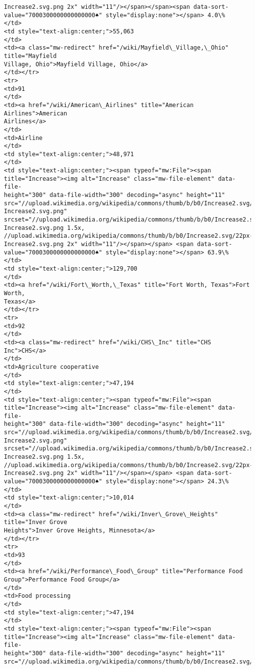 \documentclass[11pt]{article}
\begin{document}
\begin{Verbatim}[commandchars=\\\{\}]
Increase2.svg.png 2x" width="11"/></span></span><span data-sort-
value="7000300000000000000♠" style="display:none"></span> 4.0\%
</td>
<td style="text-align:center;">55,063
</td>
<td><a class="mw-redirect" href="/wiki/Mayfield\_Village,\_Ohio" title="Mayfield
Village, Ohio">Mayfield Village, Ohio</a>
</td></tr>
<tr>
<td>91
</td>
<td><a href="/wiki/American\_Airlines" title="American Airlines">American
Airlines</a>
</td>
<td>Airline
</td>
<td style="text-align:center;">48,971
</td>
<td style="text-align:center;"><span typeof="mw:File"><span
title="Increase"><img alt="Increase" class="mw-file-element" data-file-
height="300" data-file-width="300" decoding="async" height="11"
src="//upload.wikimedia.org/wikipedia/commons/thumb/b/b0/Increase2.svg/11px-
Increase2.svg.png"
srcset="//upload.wikimedia.org/wikipedia/commons/thumb/b/b0/Increase2.svg/17px-
Increase2.svg.png 1.5x,
//upload.wikimedia.org/wikipedia/commons/thumb/b/b0/Increase2.svg/22px-
Increase2.svg.png 2x" width="11"/></span></span> <span data-sort-
value="7000300000000000000♠" style="display:none"></span> 63.9\%
</td>
<td style="text-align:center;">129,700
</td>
<td><a href="/wiki/Fort\_Worth,\_Texas" title="Fort Worth, Texas">Fort Worth,
Texas</a>
</td></tr>
<tr>
<td>92
</td>
<td><a class="mw-redirect" href="/wiki/CHS\_Inc" title="CHS Inc">CHS</a>
</td>
<td>Agriculture cooperative
</td>
<td style="text-align:center;">47,194
</td>
<td style="text-align:center;"><span typeof="mw:File"><span
title="Increase"><img alt="Increase" class="mw-file-element" data-file-
height="300" data-file-width="300" decoding="async" height="11"
src="//upload.wikimedia.org/wikipedia/commons/thumb/b/b0/Increase2.svg/11px-
Increase2.svg.png"
srcset="//upload.wikimedia.org/wikipedia/commons/thumb/b/b0/Increase2.svg/17px-
Increase2.svg.png 1.5x,
//upload.wikimedia.org/wikipedia/commons/thumb/b/b0/Increase2.svg/22px-
Increase2.svg.png 2x" width="11"/></span></span> <span data-sort-
value="7000300000000000000♠" style="display:none"></span> 24.3\%
</td>
<td style="text-align:center;">10,014
</td>
<td><a class="mw-redirect" href="/wiki/Inver\_Grove\_Heights" title="Inver Grove
Heights">Inver Grove Heights, Minnesota</a>
</td></tr>
<tr>
<td>93
</td>
<td><a href="/wiki/Performance\_Food\_Group" title="Performance Food
Group">Performance Food Group</a>
</td>
<td>Food processing
</td>
<td style="text-align:center;">47,194
</td>
<td style="text-align:center;"><span typeof="mw:File"><span
title="Increase"><img alt="Increase" class="mw-file-element" data-file-
height="300" data-file-width="300" decoding="async" height="11"
src="//upload.wikimedia.org/wikipedia/commons/thumb/b/b0/Increase2.svg/11px-

\end{Verbatim}
\end{document}

